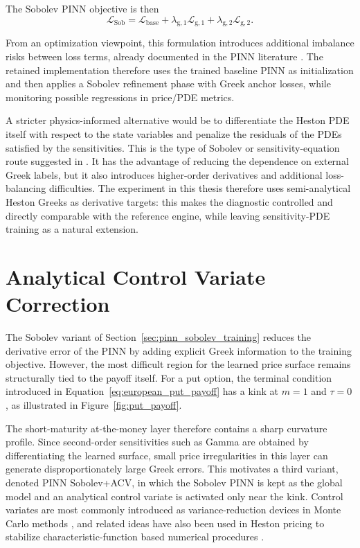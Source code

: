 The Sobolev PINN objective is then
\begin{equation}
\mathcal{L}_{\mathrm{Sob}}
=
\mathcal{L}_{\mathrm{base}}
+\lambda_{\mathrm{g},1}\mathcal{L}_{\mathrm{g},1}
+\lambda_{\mathrm{g},2}\mathcal{L}_{\mathrm{g},2}.
\end{equation}

From an optimization viewpoint, this formulation introduces additional imbalance risks between loss terms, already documented in the PINN literature \cite{wang2021gradientpath,wang2022pinnntk,urban_2025}. The retained implementation therefore uses the trained baseline PINN as initialization and then applies a Sobolev refinement phase with Greek anchor losses, while monitoring possible regressions in price/PDE metrics.

A stricter physics-informed alternative would be to differentiate the Heston PDE itself with respect to the state variables and penalize the residuals of the PDEs satisfied by the sensitivities. This is the type of Sobolev or sensitivity-equation route suggested in \cite{malandain2025deepsvm}. It has the advantage of reducing the dependence on external Greek labels, but it also introduces higher-order derivatives and additional loss-balancing difficulties. The experiment in this thesis therefore uses semi-analytical Heston Greeks as derivative targets: this makes the diagnostic controlled and directly comparable with the reference engine, while leaving sensitivity-PDE training as a natural extension.

\section{Analytical Control Variate Correction}
\label{sec:pinn_acv_correction}

The Sobolev variant of Section~\ref{sec:pinn_sobolev_training} reduces the derivative error of the PINN by adding explicit Greek information to the training objective. 
However, the most difficult region for the learned price surface remains structurally tied to the payoff itself. 
For a put option, the terminal condition introduced in Equation~\eqref{eq:european_put_payoff} has a kink at \(m=1\) and \(\tau=0\), as illustrated in Figure~\ref{fig:put_payoff}. 

The short-maturity at-the-money layer therefore contains a sharp curvature profile. 
Since second-order sensitivities such as Gamma are obtained by differentiating the learned surface, small price irregularities in this layer can generate disproportionately large Greek errors. 
This motivates a third variant, denoted PINN Sobolev+ACV, in which the Sobolev PINN is kept as the global model and an analytical control variate is activated only near the kink. Control variates are most commonly introduced as variance-reduction devices in Monte Carlo methods \cite{glasserman2004montecarlo}, and related ideas have also been used in Heston pricing to stabilize characteristic-function based numerical procedures \cite{guterding_boenkost_2018}. 

